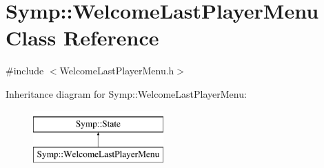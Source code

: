 \hypertarget{class_symp_1_1_welcome_last_player_menu}{\section{Symp\-:\-:Welcome\-Last\-Player\-Menu Class Reference}
\label{class_symp_1_1_welcome_last_player_menu}
}


{\ttfamily \#include $<$Welcome\-Last\-Player\-Menu.\-h$>$}

Inheritance diagram for Symp\-:\-:Welcome\-Last\-Player\-Menu\-:\begin{figure}[H]
\begin{center}
\leavevmode
\includegraphics[height=2.000000cm]{class_symp_1_1_welcome_last_player_menu}
\end{center}
\end{figure}
